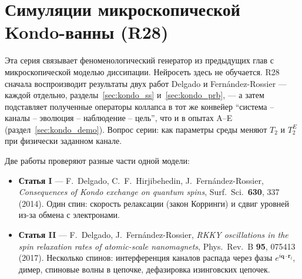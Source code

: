 \chapter{Симуляции микроскопической Kondo-ванны (R28)}
\label{chap:kondo}

Эта серия связывает феноменологический генератор из предыдущих глав с
микроскопической моделью диссипации. Нейросеть здесь не обучается. R28
сначала воспроизводит результаты двух работ Delgado и Fern\'andez-Rossier
--- каждой отдельно, разделы~\ref{sec:kondo_ss} и~\ref{sec:kondo_prb}, --- а
затем подставляет полученные операторы коллапса в тот же конвейер
``система -- каналы -- эволюция -- наблюдение -- цель'', что и в опытах A--E
(раздел~\ref{sec:kondo_demo}). Вопрос серии: как параметры среды меняют $T_2$
и $T_2^E$ при физически заданном канале.

Две работы проверяют разные части одной модели:
\begin{itemize}
\item \textbf{Статья I} --- F.~Delgado, C.~F.~Hirjibehedin,
  J.~Fern\'andez-Rossier, \emph{Consequences of Kondo exchange on quantum
  spins}, Surf.\ Sci.\ \textbf{630}, 337 (2014). Один спин: скорость
  релаксации (закон Корринги) и сдвиг уровней из-за обмена с электронами.
\item \textbf{Статья II} --- F.~Delgado, J.~Fern\'andez-Rossier,
  \emph{RKKY oscillations in the spin relaxation rates of atomic-scale
  nanomagnets}, Phys.\ Rev.\ B \textbf{95}, 075413 (2017). Несколько спинов:
  интерференция каналов распада через фазы $e^{i\mathbf q\cdot\mathbf r_l}$,
  димер, спиновые волны в цепочке, дефазировка изинговских цепочек.
\end{itemize}

